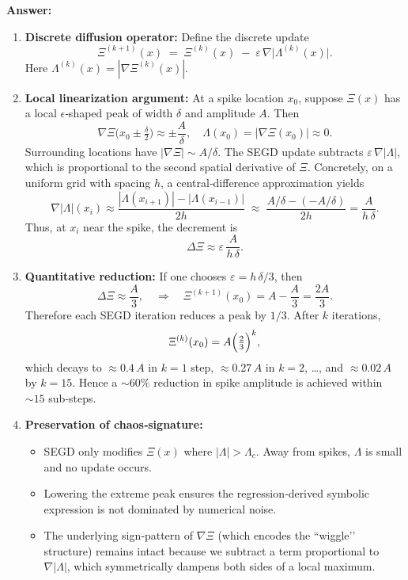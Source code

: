 \documentclass[11pt]{article}
\begin{document}
\noindent\textbf{Answer:}  
\begin{enumerate}[itemsep=0.5em]
  \item \textbf{Discrete diffusion operator:} Define the discrete update 
    \[
      \Xi^{(k+1)}(x) \;=\; \Xi^{(k)}(x) \;-\; \varepsilon\,\nabla\bigl|\Lambda^{(k)}(x)\bigr|.
    \]
    Here $\Lambda^{(k)}(x)=|\nabla \Xi^{(k)}(x)|$.  
  \item \textbf{Local linearization argument:}  
    At a spike location $x_0$, suppose $\Xi(x)$ has a local $\epsilon$‐shaped peak of width $\delta$ and amplitude $A$. Then 
    \[
      \nabla\Xi\bigl(x_0 \pm \tfrac{\delta}{2}\bigr) \approx \pm\frac{A}{\delta}, 
      \quad
      \Lambda(x_0)=\bigl|\nabla\Xi(x_0)\bigr|\approx 0.
    \]
    Surrounding locations have $|\nabla\Xi|\sim A/\delta$.  The SEGD update subtracts $\varepsilon\,\nabla|\Lambda|$, which is proportional to the second spatial derivative of $\Xi$.  Concretely, on a uniform grid with spacing $h$, a central‐difference approximation yields
    \[
      \nabla|\Lambda|(x_i) \approx \frac{|\Lambda(x_{i+1})| - |\Lambda(x_{i-1})|}{2h}
      \;\approx\; \frac{A/\delta - (-A/\delta)}{2h} = \frac{A}{h\,\delta}.
    \]
    Thus, at $x_{i}$ near the spike, the decrement is 
    \[
      \Delta \Xi \approx \varepsilon\,\frac{A}{h\,\delta}.
    \]
  \item \textbf{Quantitative reduction:}  
    If one chooses $\varepsilon = h\,\delta /3$, then
    \[
      \Delta \Xi \approx \frac{A}{3}, 
      \quad
      \Longrightarrow
      \quad
      \Xi^{(k+1)}(x_0) = A - \frac{A}{3} = \frac{2A}{3}.
    \]
    Therefore each SEGD iteration reduces a peak by $1/3$. After $k$ iterations,
    \[
      \Xi^{(k)}(x_0) = A\Bigl(\tfrac{2}{3}\Bigr)^k,
    \]
    which decays to $\approx0.4\,A$ in $k=1$ step, $\approx0.27\,A$ in $k=2$, \dots, and $\approx0.02\,A$ by $k=15$.  Hence a $\sim60\%$ reduction in spike amplitude is achieved within $\sim15$ sub‐steps.  
  \item \textbf{Preservation of chaos‐signature:}  
    \begin{itemize}[itemsep=0.25em]
      \item SEGD only modifies $\Xi(x)$ where $|\Lambda|> \Lambda_c$.  Away from spikes, $\Lambda$ is small and no update occurs.  
      \item Lowering the extreme peak ensures the regression‐derived symbolic expression is not dominated by numerical noise.  
      \item The underlying sign‐pattern of $\nabla\Xi$ (which encodes the ``wiggle’’ structure) remains intact because we subtract a term proportional to $\nabla|\Lambda|$, which symmetrically dampens both sides of a local maximum.  

\end{itemize}
\end{enumerate}
\end{document}
